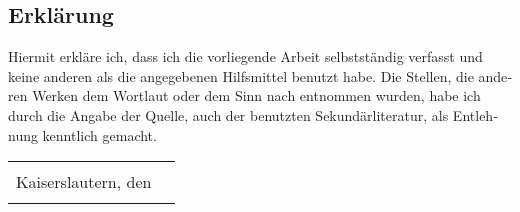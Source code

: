 \begin{otherlanguage}{ngerman}
	\chapter{Erklärung}

	Hiermit erkläre ich, dass ich die vorliegende Arbeit selbstständig verfasst und keine anderen als die angegebenen Hilfsmittel benutzt habe.
	Die Stellen, die anderen Werken dem Wortlaut oder dem Sinn nach entnommen wurden, habe ich durch die Angabe der Quelle, auch der benutzten Sekundärliteratur, als Entlehnung kenntlich gemacht.
	
	\vspace{3em}
	\begin{center}
	\begin{tabular}{cc}
		                                     & \hspace{5cm}    \\
		Kaiserslautern, den \abgabedatumDE   & \hrulefill      \\
		                                     & \TheAuthor
	\end{tabular}
	\end{center}
\end{otherlanguage}
